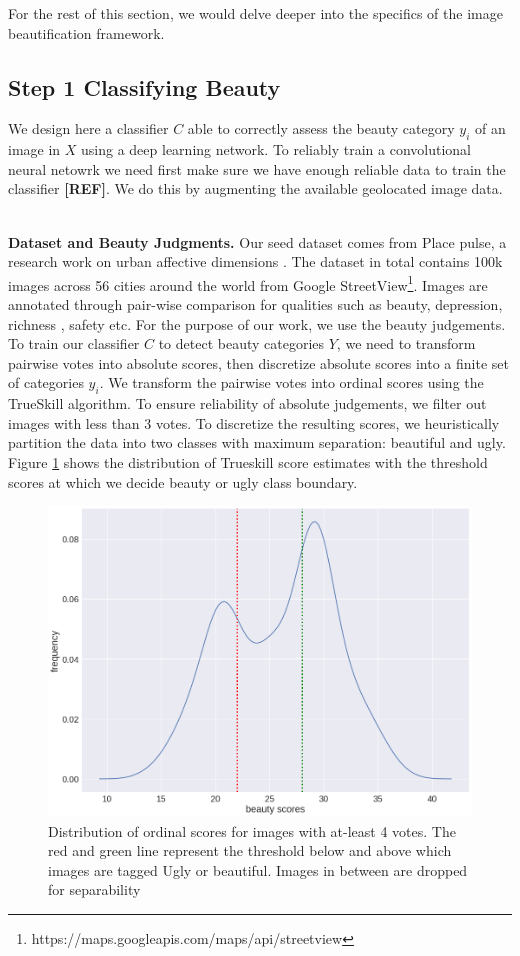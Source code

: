 For the rest of this section, we would delve deeper into the specifics of the image beautification framework. 

\subsection*{Step 1 Classifying Beauty}
We design here a classifier $C$  able to correctly assess the beauty category $y_i$ of an image in $X$ using a deep learning network. To reliably train a convolutional neural netowrk we need first make sure we have enough reliable data to train the classifier \textbf{[REF]}. We do this by augmenting the available geolocated image data. 

\mbox{} \\
\noindent
\textbf{Dataset and Beauty Judgments.}
\label{sec:label}
Our seed dataset comes from Place pulse, a research work on urban affective dimensions \cite{dubey2016deep}. The dataset in total contains 100k images across 56 cities around the world from Google StreetView\footnote{https://maps.googleapis.com/maps/api/streetview}. Images are annotated through pair-wise comparison for qualities such as beauty, depression, richness , safety etc. For the purpose of our work, we use the beauty judgements. To train our classifier $C$ to detect beauty %
categories $Y$, we need to transform pairwise votes into absolute scores, then discretize absolute scores into a finite set of categories $y_i$. We transform the pairwise votes %
into ordinal scores using the TrueSkill \cite{herbrich2007trueskill} algorithm.  To ensure reliability of absolute judgements, we filter out images with less than 3 votes.
To discretize the resulting scores, we heuristically partition the data into two classes with maximum separation: beautiful and ugly. Figure \ref{fig:Trueskill} shows the distribution of Trueskill score estimates with the threshold scores at which we decide beauty or ugly class boundary. 

\begin{figure}[ht]
	\centering
	\includegraphics[width=0.7\columnwidth]{Plot/Trueskill.png}
	\caption{Distribution of ordinal scores for images with at-least 4 votes. The red and green line represent the threshold below and above which images are tagged Ugly or beautiful. Images in between are dropped for separability }
	\label{fig:Trueskill}
\end{figure}

